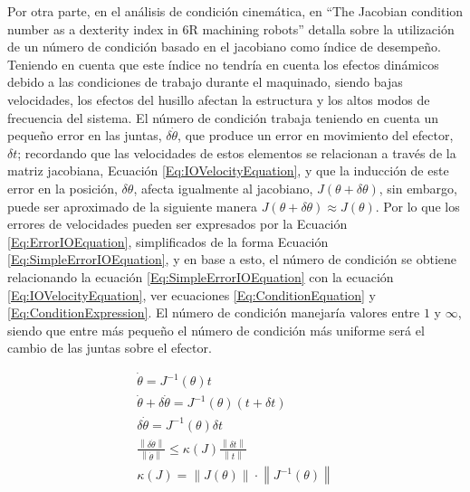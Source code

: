Por otra parte, en el análisis de condición cinemática, \cite{zargarbashi2012jacobian} en \enquote{The Jacobian condition number as a dexterity index in 6R machining robots} detalla sobre la utilización de un número de condición basado en el jacobiano como índice de desempeño. Teniendo en cuenta que este índice no tendría en cuenta los efectos dinámicos debido a las condiciones de trabajo durante el maquinado, siendo bajas velocidades, los efectos del husillo afectan la estructura y los altos modos de frecuencia del sistema. El número de condición trabaja teniendo en cuenta un pequeño error en las juntas, $\delta\dot\theta$, que produce un error en movimiento del efector, $\delta t$; recordando que las velocidades de estos elementos se relacionan a través de la matriz jacobiana, Ecuación \ref{Eq:IOVelocityEquation}, y que la inducción de este error en la posición, $\delta\theta$, afecta igualmente al jacobiano, $J\left(\theta + \delta\theta \right)$, sin embargo, puede ser aproximado de la siguiente manera $J\left(\theta + \delta\theta \right) \approx J\left(\theta\right)$. Por lo que los errores de velocidades pueden ser expresados por la Ecuación \ref{Eq:ErrorIOEquation}, simplificados de la forma Ecuación \ref{Eq:SimpleErrorIOEquation}, y en base a esto, el número de condición se obtiene relacionando la ecuación \ref{Eq:SimpleErrorIOEquation} con la ecuación \ref{Eq:IOVelocityEquation}, ver ecuaciones \ref{Eq:ConditionEquation} y \ref{Eq:ConditionExpression}. El número de condición manejaría valores entre $1$ y $\infty$, siendo que entre más pequeño el número de condición más uniforme será el cambio de las juntas sobre el efector.

\begin{subequations}
    \begin{eqnarray}
        \dot\theta = J^{-1}\left(\theta\right) t \label{Eq:IOVelocityEquation} \\
        \dot\theta + \delta\dot\theta = J^{-1}\left(\theta\right) \left(t + \delta t\right) \label{Eq:ErrorIOEquation} \\
        \delta\dot\theta = J^{-1}\left(\theta\right) \delta t \label{Eq:SimpleErrorIOEquation} \\
        \frac{\left\lVert \delta\dot\theta \right\rVert}{\left\lVert \dot\theta \right\rVert} \leq \kappa\left( J \right) \frac{\left\lVert \delta t \right\rVert}{\left\lVert t\right\rVert} \label{Eq:ConditionEquation} \\
        \kappa\left(J\right) = \left\lVert J\left(\theta\right) \right\rVert \cdot \left\lVert J^{-1}\left(\theta\right) \right\rVert \label{Eq:ConditionExpression}
    \end{eqnarray}
\end{subequations}

